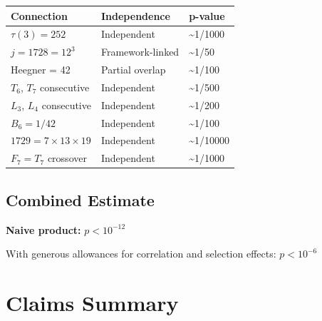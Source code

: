 \documentclass[
  11pt,
  letterpaper,
  twoside,
  openany]{book}
\makeatletter
\let\orig@section\section
\renewcommand{\section}{\needspace{8\baselineskip}\orig@section}
\let\orig@subsection\subsection
\renewcommand{\subsection}{\needspace{6\baselineskip}\orig@subsection}
\makeatother
\begin{document}
\begin{longtable}[]{@{}lll@{}}
\toprule\noalign{}
Connection & Independence & p-value \\
\midrule\noalign{}
\endhead
\bottomrule\noalign{}
\endlastfoot
\(\tau(3) = 252\) & Independent & \textasciitilde1/1000 \\
\(j = 1728 = 12^3\) & Framework-linked & \textasciitilde1/50 \\
Heegner = 42 & Partial overlap & \textasciitilde1/100 \\
\(T_6\), \(T_7\) consecutive & Independent & \textasciitilde1/500 \\
\(L_3\), \(L_4\) consecutive & Independent & \textasciitilde1/200 \\
\(B_6 = 1/42\) & Independent & \textasciitilde1/100 \\
\(1729 = 7 \times 13 \times 19\) & Independent &
\textasciitilde1/10000 \\
\(F_7 = T_7\) crossover & Independent & \textasciitilde1/1000 \\
\end{longtable}

\subsection{Combined Estimate}\label{combined-estimate}

\textbf{Naive product:} \(p < 10^{-12}\)

With generous allowances for correlation and selection effects:
\textbf{\(p < 10^{-6}\)}

\section{Claims Summary}\label{claims-summary}
\end{document}
